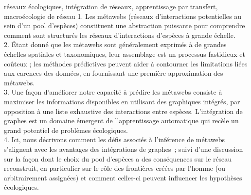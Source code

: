 \begin{resume}{réseaux écologiques, intégration de réseaux, apprentissage par transfert, macroécologie de réseau} 1. Les métawebs (réseaux d'interactions potentielles au sein d'un pool d'espèces) constituent une abstraction puissante pour comprendre comment sont structurés les réseaux d'interactions d'espèces à grande échelle.\\
2. Étant donné que les métawebs sont généralement exprimés à de grandes échelles spatiales et taxonomiques, leur assemblage est un processus fastidieux et coûteux ; les méthodes prédictives peuvent aider à contourner les limitations liées aux carences des données, en fournissant une première approximation des métawebs.\\
3. Une façon d'améliorer notre capacité à prédire les métawebs consiste à maximiser les informations disponibles en utilisant des graphiques intégrés, par opposition à une liste exhaustive des interactions entre espèces. L'intégration de graphes est un domaine émergent de l'apprentissage automatique qui recèle un grand potentiel de problèmes écologiques.\\
4. Ici, nous décrivons comment les défis associés à l'inférence de métawebs s'alignent avec les avantages des intégrations de graphes ; suivi d'une discussion sur la façon dont le choix du pool d'espèces a des conséquences sur le réseau reconstruit, en particulier sur le rôle des frontières créées par l'homme (ou arbitrairement assignées) et comment celles-ci peuvent influencer les hypothèses écologiques.
\end{resume}

\begin{abstract}{ecological networks, network embedding, transfer learning, netwrok macroecology} 1. Metawebs (networks of potential interactions within a species pool) are a powerful abstraction to understand how large-scale species interaction networks are structured.\\
2. Because metawebs are typically expressed at large spatial and taxonomic scales, assembling them is a tedious and costly process; predictive methods can help circumvent the limitations in data deficiencies, by providing a first approximation of metawebs.\\
3. One way to improve our ability to predict metawebs is to maximize available information by using graph embeddings, as opposed to an exhaustive list of species interactions. Graph embedding is an emerging field in machine learning that holds great potential for ecological problems.\\
4. Here, we outline how the challenges associated with inferring metawebs line-up with the advantages of graph embeddings; followed by a discussion as to how the choice of the species pool has consequences on the reconstructed network, specifically as to the role of human-made (or arbitrarily assigned) boundaries and how these my influence ecological hypotheses.
\end{abstract}

